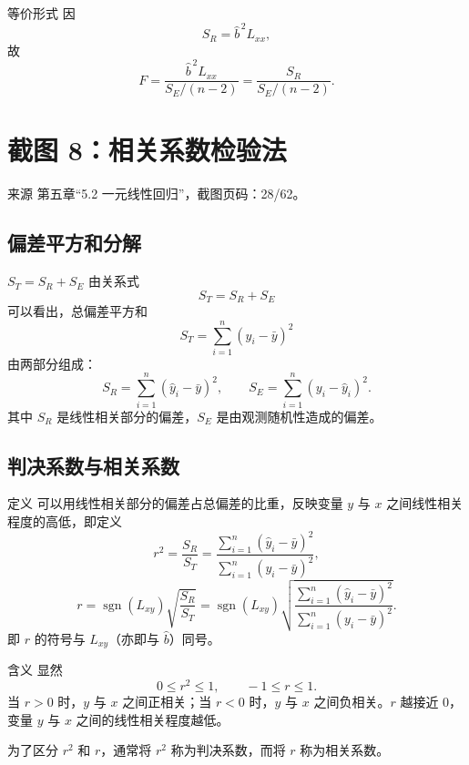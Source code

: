 \documentclass[UTF8,zihao=-4,fontset=fandol]{ctexart}
\begin{document}
\begin{keybox}{等价形式}
因
\[
S_R=\hat{b}^{\,2}L_{xx},
\]
故
\[
F=\frac{\hat{b}^{\,2}L_{xx}}{S_E/(n-2)}
=
\frac{S_R}{S_E/(n-2)}.
\]
\end{keybox}

\section{截图 8：相关系数检验法}

\begin{sourcebox}{来源}
第五章“5.2 一元线性回归”，截图页码：28/62。
\end{sourcebox}

\subsection{偏差平方和分解}

\begin{keybox}{$S_T=S_R+S_E$}
由关系式
\[
S_T=S_R+S_E
\]
可以看出，总偏差平方和
\[
S_T=\sum_{i=1}^{n}(y_i-\bar{y})^2
\]
由两部分组成：
\[
S_R=\sum_{i=1}^{n}(\hat{y}_i-\bar{y})^2,\qquad
S_E=\sum_{i=1}^{n}(y_i-\hat{y}_i)^2.
\]
其中 $S_R$ 是线性相关部分的偏差，$S_E$ 是由观测随机性造成的偏差。
\end{keybox}

\subsection{判决系数与相关系数}

\begin{keybox}{定义}
可以用线性相关部分的偏差占总偏差的比重，反映变量 $y$ 与 $x$ 之间线性相关程度的高低，即定义
\[
r^2=
\frac{S_R}{S_T}
=
\frac{\sum_{i=1}^{n}(\hat{y}_i-\bar{y})^2}
{\sum_{i=1}^{n}(y_i-\bar{y})^2},
\]
\[
r=\operatorname{sgn}(L_{xy})\sqrt{\frac{S_R}{S_T}}
=
\operatorname{sgn}(L_{xy})
\sqrt{
\frac{\sum_{i=1}^{n}(\hat{y}_i-\bar{y})^2}
{\sum_{i=1}^{n}(y_i-\bar{y})^2}
}.
\]
即 $r$ 的符号与 $L_{xy}$（亦即与 $\hat{b}$）同号。
\end{keybox}

\begin{methodbox}{含义}
显然
\[
0\le r^2\le 1,\qquad -1\le r\le 1.
\]
当 $r>0$ 时，$y$ 与 $x$ 之间正相关；当 $r<0$ 时，$y$ 与 $x$ 之间负相关。$r$ 越接近 $0$，变量 $y$ 与 $x$ 之间的线性相关程度越低。

为了区分 $r^2$ 和 $r$，通常将 $r^2$ 称为判决系数，而将 $r$ 称为相关系数。
\end{methodbox}
\end{document}
